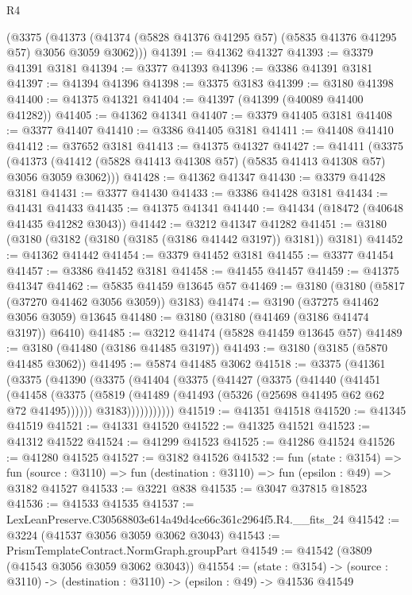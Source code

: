 \begin{lexlean}{R4}
\begin{coremodule}
    (@3375 (@41373 (@41374 (@5828 @41376 @41295 @57) (@5835 @41376 @41295 @57) @3056 @3059 @3062)))
@41391 := @41362 @41327
@41393 := @3379 @41391 @3181
@41394 := @3377 @41393
@41396 := @3386 @41391 @3181
@41397 := @41394 @41396
@41398 := @3375 @3183
@41399 := @3180 @41398
@41400 := @41375 @41321
@41404 := @41397 (@41399 (@40089 @41400 @41282))
@41405 := @41362 @41341
@41407 := @3379 @41405 @3181
@41408 := @3377 @41407
@41410 := @3386 @41405 @3181
@41411 := @41408 @41410
@41412 := @37652 @3181
@41413 := @41375 @41327
@41427 := @41411
    (@3375 (@41373 (@41412 (@5828 @41413 @41308 @57) (@5835 @41413 @41308 @57) @3056 @3059 @3062)))
@41428 := @41362 @41347
@41430 := @3379 @41428 @3181
@41431 := @3377 @41430
@41433 := @3386 @41428 @3181
@41434 := @41431 @41433
@41435 := @41375 @41341
@41440 := @41434 (@18472 (@40648 @41435 @41282 @3043))
@41442 := @3212 @41347 @41282
@41451 := @3180 (@3180 (@3182 (@3180 (@3185 (@3186 @41442 @3197)) @3181)) @3181)
@41452 := @41362 @41442
@41454 := @3379 @41452 @3181
@41455 := @3377 @41454
@41457 := @3386 @41452 @3181
@41458 := @41455 @41457
@41459 := @41375 @41347
@41462 := @5835 @41459 @13645 @57
@41469 := @3180 (@3180 (@5817 (@37270 @41462 @3056 @3059)) @3183)
@41474 := @3190 (@37275 @41462 @3056 @3059) @13645
@41480 := @3180 (@3180 (@41469 (@3186 @41474 @3197)) @6410)
@41485 := @3212 @41474 (@5828 @41459 @13645 @57)
@41489 := @3180 (@41480 (@3186 @41485 @3197))
@41493 := @3180 (@3185 (@5870 @41485 @3062))
@41495 := @5874 @41485 @3062
@41518 := @3375
    (@41361
      (@3375
        (@41390
          (@3375
            (@41404
              (@3375
                (@41427
                  (@3375
                    (@41440
                      (@41451
                        (@41458
                          (@3375
                            (@5819 (@41489 (@41493 (@5326 (@25698 @41495 @62 @62 @72 @41495))))))
                          @3183)))))))))))
@41519 := @41351 @41518
@41520 := @41345 @41519
@41521 := @41331 @41520
@41522 := @41325 @41521
@41523 := @41312 @41522
@41524 := @41299 @41523
@41525 := @41286 @41524
@41526 := @41280 @41525
@41527 := @3182 @41526
@41532 := fun (state : @3154) =>
  fun (source : @3110) => fun (destination : @3110) => fun (epsilon : @49) => @3182 @41527
@41533 := @3221 @838
@41535 := @3047 @37815 @18523
@41536 := @41533 @41535
@41537 := LexLeanPreserve.C30568803e614a49d4ce66c361c2964f5.R4.__fits_24
@41542 := @3224 (@41537 @3056 @3059 @3062 @3043)
@41543 := PrismTemplateContract.NormGraph.groupPart
@41549 := @41542 (@3809 (@41543 @3056 @3059 @3062 @3043))
@41554 := (state : @3154) ->
  (source : @3110) -> (destination : @3110) -> (epsilon : @49) -> @41536 @41549

\end{coremodule}
\end{lexlean}
